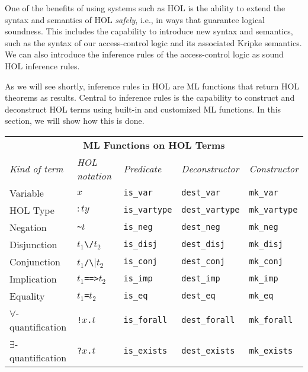 One of the benefits of using systems such as HOL is the ability to
extend the syntax and semantics of HOL \emph{safely}, i.e., in ways
that guarantee logical soundness.  This includes the capability to
introduce new syntax and semantics, such as the syntax of our
access-control logic and its associated Kripke semantics. We can also
introduce the inference rules of the access-control logic as sound HOL
inference rules.

As we will see shortly, inference rules in HOL are ML functions that
return HOL theorems as results. Central to inference rules is the
capability to construct and deconstruct HOL terms using built-in and
customized ML functions.  In this section, we will show how this is
done.

\begin{table}[tb]
  \centering
  \begin{tabular}{|l|l|l|l|l|}
    \hline
    \multicolumn{5}{|c|}{\textbf{ML Functions on HOL Terms}}\\
    \emph{Kind of term} & \emph{HOL notation} & \emph{Predicate} & \emph{Deconstructor} & \emph{Constructor}\\
    \hline
    Variable & $x$ & \small{\verb|is_var|}& \small{\verb|dest_var|}& \small{\verb|mk_var|}\\
    \hline
    HOL Type & $:ty$ & \small{\verb|is_vartype|} & \small{\verb|dest_vartype|} & \small{\verb|mk_vartype|} \\
    \hline
    Negation & {\small\verb|~|}$t$ &\small{\verb|is_neg|} & \small{\verb|dest_neg|}& \small{\verb|mk_neg|}\\
    \hline
    Disjunction & $t_1${\small\verb|\/|}$t_2$ & \small{\verb|is_disj|}& \small{\verb|dest_disj|}& \small{\verb|mk_disj|}\\
    \hline
    Conjunction & $t_1${\small\verb|/\|}$t_2$ & \small{\verb|is_conj|}& \small{\verb|dest_conj|}& \small{\verb|mk_conj|}\\
    \hline
    Implication & $t_1${\small\verb|==>|}$t_2$ & \small{\verb|is_imp|}& \small{\verb|dest_imp|}& \small{\verb|mk_imp|}\\
    \hline
    Equality & $t_1${\small\verb|=|}$t_2$ & \small{\verb|is_eq|}& \small{\verb|dest_eq|}& \small{\verb|mk_eq|}\\
    \hline
    $\forall$-quantification & {\small\verb|!|}$x${\small\verb|.|}$t$ & \small{\verb|is_forall|}& \small{\verb|dest_forall|}& \small{\verb|mk_forall|}\\
    \hline
    $\exists$-quantification & {\small\verb|?|}$x${\small\verb|.|}$t$ & \small{\verb|is_exists|}& \small{\verb|dest_exists|}& \small{\verb|mk_exists|}\\

\end{tabular}
\end{table}
